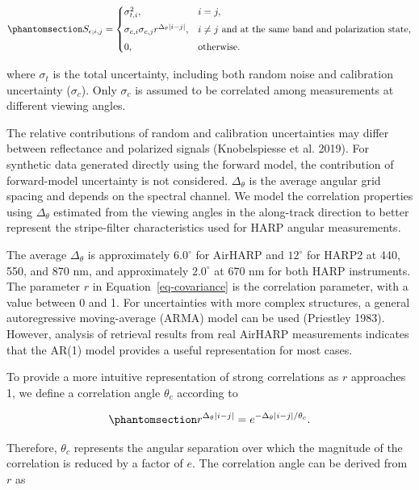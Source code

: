 \documentclass[
  11pt,
  letterpaper,
  DIV=11,
  numbers=noendperiod]{scrreprt}
\begin{document}
\begin{equation}\phantomsection\label{eq-covariance}{
S_{\epsilon;i,j}
=
\begin{cases}
\sigma_{t,i}^2,
& i=j, \\[4pt]
\sigma_{c,i}\sigma_{c,j}
r^{\Delta_\theta |i-j|},
& i\ne j \text{ and at the same band and polarization state}, \\[4pt]
0,
& \text{otherwise}.
\end{cases}
}\end{equation}

where \(\sigma_t\) is the total uncertainty, including both random noise
and calibration uncertainty (\(\sigma_c\)). Only \(\sigma_c\) is assumed
to be correlated among measurements at different viewing angles.

The relative contributions of random and calibration uncertainties may
differ between reflectance and polarized signals (Knobelspiesse et al.
2019). For synthetic data generated directly using the forward model,
the contribution of forward-model uncertainty is not considered.
\(\Delta_\theta\) is the average angular grid spacing and depends on the
spectral channel. We model the correlation properties using
\(\Delta_\theta\) estimated from the viewing angles in the along-track
direction to better represent the stripe-filter characteristics used for
HARP angular measurements.

The average \(\Delta_\theta\) is approximately \(6.0^\circ\) for AirHARP
and \(12^\circ\) for HARP2 at 440, 550, and 870 nm, and approximately
\(2.0^\circ\) at 670 nm for both HARP instruments. The parameter \(r\)
in Equation~\ref{eq-covariance} is the correlation parameter, with a
value between 0 and 1. For uncertainties with more complex structures, a
general autoregressive moving-average (ARMA) model can be used
(Priestley 1983). However, analysis of retrieval results from real
AirHARP measurements indicates that the AR(1) model provides a useful
representation for most cases.

To provide a more intuitive representation of strong correlations as
\(r\) approaches 1, we define a correlation angle \(\theta_c\) according
to

\begin{equation}\phantomsection\label{eq-correlation-angle}{
r^{\Delta_\theta |i-j|}
=
e^{-\Delta_\theta |i-j|/\theta_c}.
}\end{equation}

Therefore, \(\theta_c\) represents the angular separation over which the
magnitude of the correlation is reduced by a factor of \(e\). The
correlation angle can be derived from \(r\) as
\end{document}
